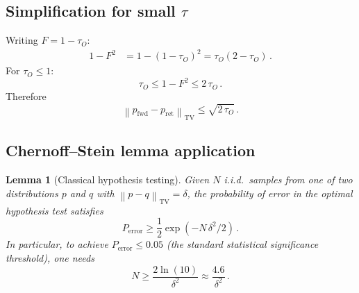 \documentclass[aps,prd,preprint,superscriptaddress,longbibliography]{revtex4-2}
\newtheorem{lemma}[theorem]{Lemma}
\newcommand{\norm}[1]{\left\|#1\right\|}
\newcommand{\tauasym}{\tau}
\begin{document}
\subsection{Simplification for small $\tauasym$}

Writing $F = 1 - \tauasym_O$:
\begin{align}
  1 - F^2 &= 1 - (1-\tauasym_O)^2
  = \tauasym_O(2-\tauasym_O)\,.
  \label{eq:1minusF2}
\end{align}
For $\tauasym_O \leq 1$:
\begin{equation}
  \tauasym_O \leq 1 - F^2 \leq 2\,\tauasym_O\,.
  \label{eq:1minusF2_bounds}
\end{equation}
Therefore
\begin{equation}
  \norm{p_{\mathrm{fwd}} - p_{\mathrm{ret}}}_{\mathrm{TV}}
  \leq \sqrt{2\,\tauasym_O}\,.
  \label{eq:TV_tau}
\end{equation}

\subsection{Chernoff--Stein lemma application}

\begin{lemma}[Classical hypothesis testing]
\label{lem:Chernoff}
Given $N$ i.i.d.\ samples from one of two distributions $p$ and $q$
with $\norm{p-q}_{\mathrm{TV}} = \delta$, the probability of error in
the optimal hypothesis test satisfies
\begin{equation}
  P_{\mathrm{error}} \geq \frac{1}{2}\exp(-N\,\delta^2/2)\,.
  \label{eq:Chernoff}
\end{equation}
In particular, to achieve $P_{\mathrm{error}} \leq 0.05$ (the standard
statistical significance threshold), one needs
\begin{equation}
  N \geq \frac{2\ln(10)}{\delta^2} \approx \frac{4.6}{\delta^2}\,.
  \label{eq:N_needed}
\end{equation}
\end{lemma}
\end{document}
